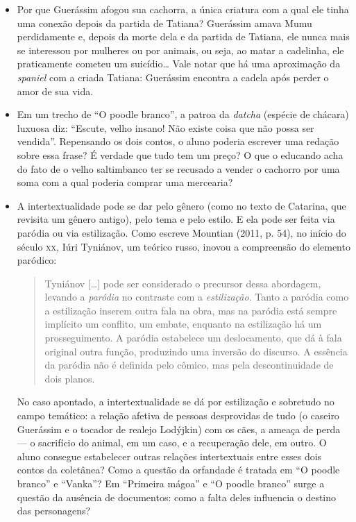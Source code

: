 \documentclass[11pt]{extarticle}
\begin{document}
\begin{itemize}
\item Por que Guerássim afogou sua cachorra, a única criatura com a qual ele
tinha uma conexão depois da partida de Tatiana? Guerássim amava Mumu
perdidamente e, depois da morte dela e da partida de Tatiana, ele nunca
mais se interessou por mulheres ou por animais, ou seja, ao matar a
cadelinha, ele praticamente cometeu um suicídio\ldots{} Vale notar que há uma
aproximação da \emph{spaniel} com a criada Tatiana: Guerássim encontra a
cadela após perder o amor de sua vida.

\item Em um trecho de ``O poodle branco'', a patroa da \emph{datcha}
(espécie de chácara) luxuosa diz: ``Escute, velho insano! Não existe
coisa que não possa ser vendida''. Repensando os dois contos, o aluno
poderia escrever uma redação sobre essa frase? É verdade que tudo tem um
preço? O que o educando acha do fato de o velho saltimbanco ter se
recusado a vender o cachorro por uma soma com a qual poderia comprar uma
mercearia?

\item A intertextualidade pode se dar pelo gênero (como no texto de
Catarina, que revisita um gênero antigo), pelo tema e pelo estilo. E ela
pode ser feita via paródia ou via estilização. Como escreve Mountian
(2011, p. 54), no início do século \textsc{xx}, Iúri Tyniánov, um teórico russo,
inovou a compreensão do elemento paródico:

\begin{quote}
Tyniánov {[}\ldots{}{]} pode ser considerado o precursor dessa abordagem,
levando a \emph{paródia} no contraste com a \emph{estilização}. Tanto a
paródia como a estilização inserem outra fala na obra, mas na paródia
está sempre implícito um conflito, um embate, enquanto na estilização há
um prosseguimento. A paródia estabelece um deslocamento, que dá à fala
original outra função, produzindo uma inversão do discurso. A essência
da paródia não é definida pelo cômico, mas pela descontinuidade de dois
planos.
\end{quote}

No caso apontado, a intertextualidade se dá por estilização e sobretudo
no campo temático: a relação afetiva de pessoas desprovidas de tudo (o
caseiro Guerássim e o tocador de realejo Lodýjkin) com os cães, a ameaça
de perda --- o sacrifício do animal, em um caso, e a recuperação dele,
em outro. O aluno consegue estabelecer outras relações intertextuais
entre esses dois contos da coletânea? Como a questão da orfandade é
tratada em ``O poodle branco'' e ``Vanka''? Em ``Primeira mágoa'' e
``O poodle branco'' surge a questão da ausência de documentos: como a
falta deles influencia o destino das personagens?
\end{itemize}
\end{document}
